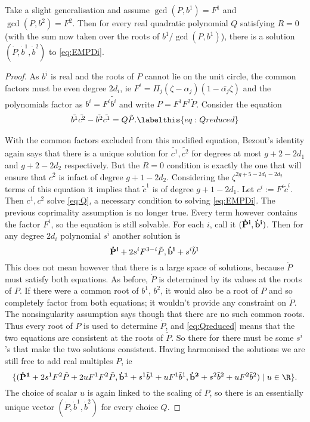 \begin{lem}
Take a slight generalisation and assume $\gcd(P,b^1)=F^1$ and $\gcd(P,b^2)=F^2$. Then for every real quadratic polynomial $Q$ satisfying $R=0$ (with the sum now taken over the roots of $b^1/\gcd(P,b^1)$), there is a solution $(\dot P, \dot b^1, \dot b^2)$ to \eqref{eq:EMPDi}.
\begin{proof}

As $b^i$ is real and the roots of $P$ cannot lie on the unit circle, the common factors must be even degree $2d_i$, ie $F^i=\Pi_j (ζ-α_j)(1-\bar{α_j}ζ)$ and the polynomials factor as $b^i = F^i\tilde{b^i}$ and write $P = F^1F^2\tilde{P}$. Consider the equation
\begin{align}
\tilde{b^1}\tilde{c^2} - \tilde{b^2}\tilde{c^1} = Q\tilde{P}.\labelthis{eq:Qreduced}
\end{align}

With the common factors excluded from this modified equation, Bezout's identity again says that there is a unique solution for $\tilde{c^1},\tilde{c^2}$ for degrees at most $g+2-2d_1$ and $g+2-2d_2$ respectively. But the $R=0$ condition is exactly the one that will ensure that $c^2$ is infact of degree $g+1-2d_2$. Considering the $ζ^{2g+5-2d_1-2d_2}$ terms of this equation it implies that $\tilde{c}^1$ is of degree $g+1-2d_1$. Let $c^i :=  F^i\tilde{c}^i$. Then $c^1, c^2$ solve \eqref{eq:Q}, a necessary condition to solving \eqref{eq:EMPDi}. The previous coprimality assumption is no longer true. Every term however contains the factor $F^i$, so the equation is still solvable. For each $i$, call it $({\bf\dot P^i}, {\bf\dot b^i})$. Then for any degree $2d_i$ polynomial $s^i$ another solution is
\[
{\bf\dot P^i} + 2s^i F^{3-i}\tilde P, {\bf\dot b^i} + s^i \tilde b^1
\]
This does not mean however that there is a large space of solutions, because $\dot P$ must satisfy both equations. As before, $\dot P$ is determined by its values at the roots of $P$. If there were a common root of $b^1$, $b^2$, it would also be a root of $P$ and so completely factor from both equations; it wouldn't provide any constraint on $\dot P$. The nonsingularity assumption says though that there are no such common roots. Thus every root of $P$ is used to determine $\dot P$, and \eqref{eq:Qreduced} means that the two equations are consistent at the roots of $\tilde P$. So there for there must be some $s^i$'s that make the two solutions consistent. Having harmonised the solutions we are still free to add real multiples $P$, ie
\[
\{ ({\bf \dot P^1} + 2s^1 F^2 \tilde{P} + 2u F^1F^2\tilde{P}, {\bf \dot b^1} + s^1\tilde{b}^1 + u F^1\tilde{b}^1, {\bf \dot b^2} + s^2\tilde{b}^2 + uF^2 \tilde{b}^2) \mid u \in \R\}.
\]
The choice of scalar $u$ is again linked to the scaling of $P$, so there is an essentially unique vector $(\dot P, \dot b^1, \dot b^2)$ for every choice $Q$.
\end{proof}
\end{lem}
